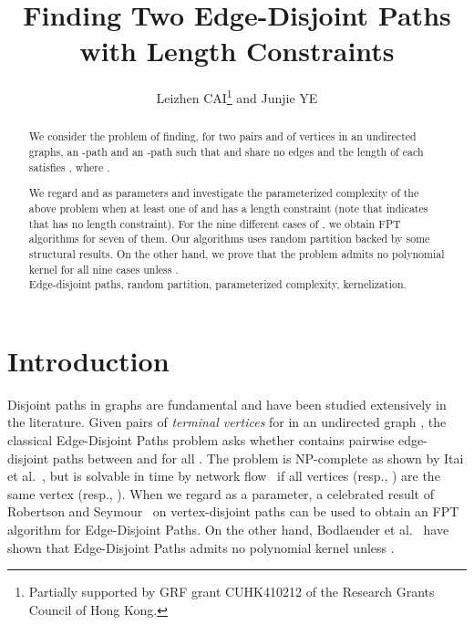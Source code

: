 \documentclass{llncs}
\begin{document}
\title{ 
\Large \bf  Finding Two Edge-Disjoint Paths with Length Constraints
}
\author{
	Leizhen CAI\thanks{Partially supported by GRF grant CUHK410212 of the Research Grants Council of Hong Kong.} and Junjie YE}
\maketitle

\begin{abstract}
	We consider the problem of finding, for two pairs 
	and  of vertices in an undirected graphs, an -path 
	and an -path  such that  and  share no edges and
	the length of each  satisfies , where
	.
	
	We regard  and  as parameters and investigate the parameterized complexity
	of the above problem when at least one of  and  has a length constraint
	(note that  indicates that  has no length constraint).
	For the nine different cases of , we obtain FPT algorithms for seven of them.
	Our algorithms uses random partition backed by some structural results.
	On the other hand,  we prove that the problem admits no polynomial kernel for
	all nine cases unless . \\

	 Edge-disjoint paths, random partition, parameterized complexity,
	kernelization.
\end{abstract}

\section{Introduction}

Disjoint paths in graphs are fundamental and have been studied extensively in the literature. 
Given  pairs of {\em terminal vertices}  for  in an undirected 
graph , the classical {\sc Edge-Disjoint Paths} problem asks whether  contains  
pairwise edge-disjoint paths  between  and  for all . 
The problem is NP-complete as shown by Itai et al.~\cite{itai1982complexity},
but is solvable in time  by network flow~\cite{orlin2013max} 
if all vertices  (resp.,  ) are the same vertex  (resp.,  ). 
When we regard  as a parameter, a celebrated result of Robertson and 
Seymour~\cite{robertson1995graph} on vertex-disjoint paths can be used to
obtain an FPT algorithm for {\sc Edge-Disjoint Paths}.
On the other hand, Bodlaender et al.~\cite{bodlaender2011kernel} have shown that 
{\sc Edge-Disjoint Paths} admits no polynomial kernel unless .  
\end{document}
